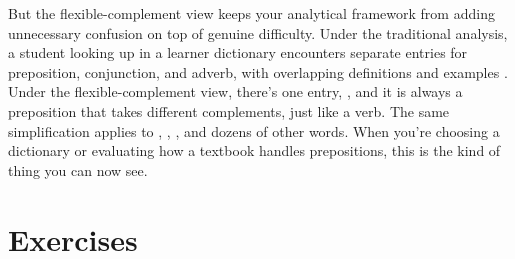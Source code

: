 But the flexible-complement view keeps your analytical framework from adding unnecessary confusion on top of genuine difficulty. Under the traditional analysis, a student looking up  in a learner dictionary encounters separate entries for preposition, conjunction, and adverb, with overlapping definitions and examples \citep[see][for a detailed comparison]{reynolds2025}. Under the flexible-complement view, there's one entry, , and it is always a preposition that takes different complements, just like a verb. The same simplification applies to , , , and dozens of other words. When you're choosing a dictionary or evaluating how a textbook handles prepositions, this is the kind of thing you can now see.




\section*{Exercises}  %

